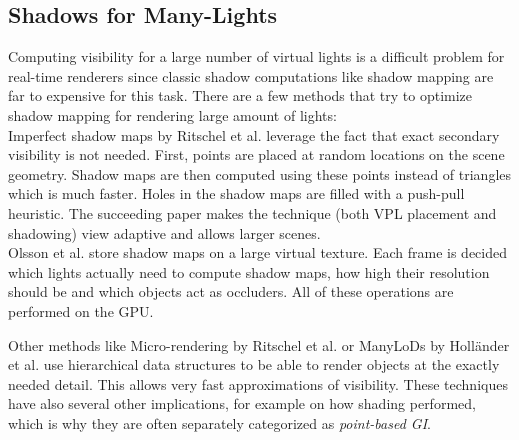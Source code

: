 \documentclass[thesis.tex]{subfiles}
\begin{document}
\subsection{Shadows for Many-Lights}
Computing visibility for a large number of virtual lights is a difficult problem for real-time renderers since classic shadow computations like shadow mapping are far to expensive for this task.
There are a few methods that try to optimize shadow mapping for rendering large amount of lights:
\\
Imperfect shadow maps by Ritschel et al. \cite{bib:imperfectshadowmaps} leverage the fact that exact secondary visibility is not needed.
First, points are placed at random locations on the scene geometry.
Shadow maps are then computed using these points instead of triangles which is much faster.
Holes in the shadow maps are filled with a push-pull heuristic.
The succeeding paper \cite{bib:imperfectshadowmaps:adapative} makes the technique (both VPL placement and shadowing) view adaptive and allows larger scenes.
\\
Olsson et al. \cite{bib:virtualshadowmaps} store shadow maps on a large virtual texture.
Each frame is decided which lights actually need to compute shadow maps, how high their resolution should be and which objects act as occluders.
All of these operations are performed on the GPU.

Other methods like Micro-rendering by Ritschel et al. \cite{bib:microrendering} or ManyLoDs by Holländer et al. \cite{bib:manylods} use hierarchical data structures to be able to render objects at the exactly needed detail.
This allows very fast approximations of visibility.
These techniques have also several other implications, for example on how shading performed, which is why they are often separately categorized as \emph{point-based GI}.

%
%
\end{document}
